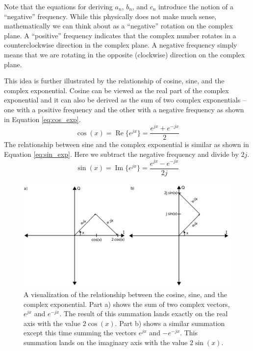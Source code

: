 Note that the equations for deriving $a_n$, $b_n$, and $c_n$ introduce the notion of a ``negative'' frequency. While this physically does not make much sense, mathematically we can think about as a ``negative'' rotation on the complex plane. A ``positive'' frequency indicates that the complex number rotates in a counterclockwise direction in the complex plane. A negative frequency simply means that we are rotating in the opposite (clockwise) direction on the complex plane. 



This idea is further illustrated by the relationship of cosine, sine, and the complex exponential.  Cosine can be viewed as the real part of the complex exponential and it can also be derived as the sum of two complex exponentials -- one with a positive frequency and the other with a negative frequency as shown in Equation \ref{eq:cos_exp}.
\begin{equation}
\cos(x) = \operatorname{Re} \{ e^{jx} \} = \frac{e^{jx} + e^{-jx}}{2}
\label{eq:cos_exp}
\end{equation} 
The relationship between sine and the complex exponential is similar as shown in Equation \ref{eq:sin_exp}. Here we subtract the negative frequency and divide by $2j$.
\begin{equation}
\sin(x) = \operatorname{Im} \{ e^{jx} \} = \frac{e^{jx} - e^{-jx}}{2j} 
\label{eq:sin_exp}
\end{equation}

\begin{figure}
\centering
\includegraphics[width= \textwidth]{images/sin_cos_exp}
\caption{A visualization of the relationship between the cosine, sine, and the complex exponential. Part a) shows the sum of two complex vectors, $e^{jx}$ and $e^{-jx}$. The result of this summation lands exactly on the real axis with the value $2 \cos (x)$. Part b) shows a similar summation except this time summing the vectors $e^{jx}$ and $-e^{-jx}$. This summation lands on the imaginary axis with the value $2 \sin (x)$.}
\label{fig:sin_cos_exp}
\end{figure}


